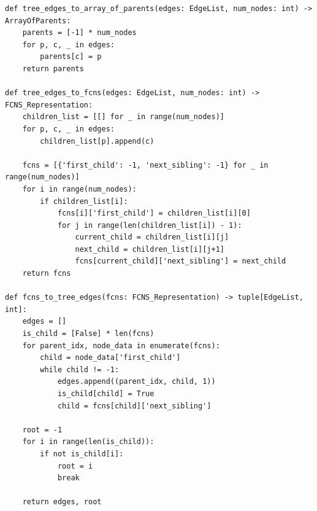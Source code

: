 \documentclass[a4paper,12pt]{article}
\begin{document}
\begin{lstlisting}[style=pythonstyle, caption={Bộ chuyển đổi đồ thị và cây trong Python.}, label={lst:py_converters_4}]
def tree_edges_to_array_of_parents(edges: EdgeList, num_nodes: int) -> ArrayOfParents:
    parents = [-1] * num_nodes
    for p, c, _ in edges:
        parents[c] = p
    return parents

def tree_edges_to_fcns(edges: EdgeList, num_nodes: int) -> FCNS_Representation:
    children_list = [[] for _ in range(num_nodes)]
    for p, c, _ in edges:
        children_list[p].append(c)

    fcns = [{'first_child': -1, 'next_sibling': -1} for _ in range(num_nodes)]
    for i in range(num_nodes):
        if children_list[i]:
            fcns[i]['first_child'] = children_list[i][0]
            for j in range(len(children_list[i]) - 1):
                current_child = children_list[i][j]
                next_child = children_list[i][j+1]
                fcns[current_child]['next_sibling'] = next_child
    return fcns

def fcns_to_tree_edges(fcns: FCNS_Representation) -> tuple[EdgeList, int]:
    edges = []
    is_child = [False] * len(fcns)
    for parent_idx, node_data in enumerate(fcns):
        child = node_data['first_child']
        while child != -1:
            edges.append((parent_idx, child, 1))
            is_child[child] = True
            child = fcns[child]['next_sibling']
    
    root = -1
    for i in range(len(is_child)):
        if not is_child[i]:
            root = i
            break
            
    return edges, root
\end{lstlisting}
\end{document}
